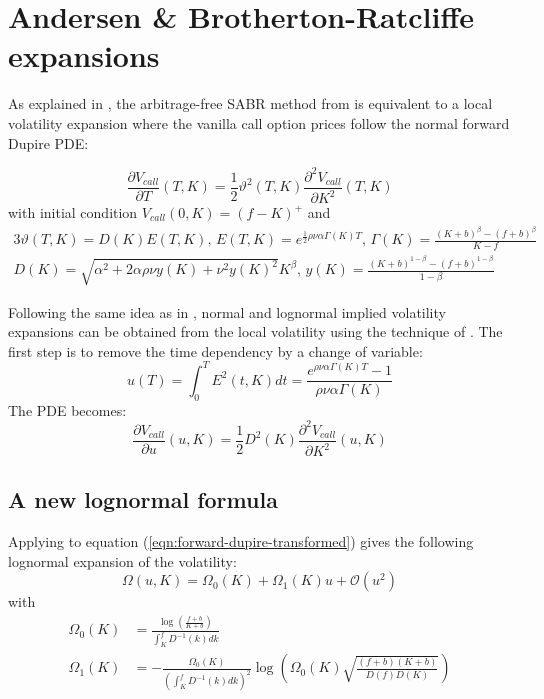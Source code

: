 \documentclass[]{rAMF2e}
\begin{document}

\section{Andersen \& Brotherton-Ratcliffe expansions}
As explained in \citep{lefloch2014fdmsabr}, the arbitrage-free SABR method from \citet{hagan2013arbitrage} is equivalent to a local volatility expansion where the vanilla call option prices follow the normal forward Dupire PDE:

\begin{equation}\label{eqn:forward-dupire}
\frac{\partial V_{call}}{\partial T}(T,K) = \frac{1}{2}\vartheta^2(T,K) \frac{\partial^2 V_{call}}{\partial K^2}(T,K)
\end{equation} 
with initial condition $V_{call}(0, K) = (f-K)^{+}$ and
\begin{alignat}{3}
\vartheta(T,K) = D(K) E(T,K) \text{, } E(T,K) = e^{\frac{1}{2}\rho\nu\alpha\Gamma(K) T} \text{, } \Gamma(K) = \frac{(K+b)^{\beta}-(f+b)^{\beta}}{K-f}\\
D(K) = \sqrt{\alpha^2 +2\alpha\rho\nu y(K)+ \nu^2 y(K)^2} K^{\beta} \text{, } y(K) = \frac{(K+b)^{1-\beta}-(f+b)^{1-\beta}}{1-\beta}
\end{alignat}

Following the same idea as in \citep{karlsmark2013sabr}, normal and lognormal implied volatility expansions can be obtained from the local volatility using the technique of \citep{andersen2005extended}. The first step is to remove the time dependency by a change of variable:
\begin{equation}
u(T) = \int_{0}^{T}E^2(t,K)dt = \frac{e^{\rho\nu\alpha\Gamma(K) T} - 1}{\rho\nu\alpha\Gamma(K)}
\end{equation}
The PDE becomes:
\begin{equation}\label{eqn:forward-dupire-transformed}
\frac{\partial V_{call}}{\partial u}(u,K) = \frac{1}{2}D^2(K) \frac{\partial^2 V_{call}}{\partial K^2}(u,K)
\end{equation} 
\subsection{A new lognormal formula}
Applying \citet[proposition B.1]{andersen2005extended} to equation (\ref{eqn:forward-dupire-transformed}) gives the following lognormal expansion of the volatility:
\begin{equation}
\Omega(u, K) = \Omega_0(K) + \Omega_1(K) u + \mathcal{O}(u^2)
\end{equation}
with 
\begin{align}
\Omega_0(K) &= \frac{\log\left(\frac{f+b}{K+b}\right)}{\int_K^f D^{-1}(k)dk} \\
\Omega_1(K) &= - \frac{\Omega_0(K)}{\left(\int_K^f D^{-1}(k)dk\right)^2}\log\left(\Omega_0(K)\sqrt{\frac{(f+b) (K+b)}{D(f)D(K)}}\right)
\end{align}
\end{document}
